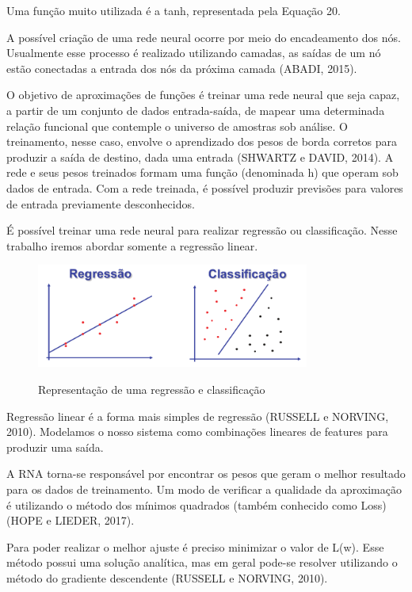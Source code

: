 Uma função muito utilizada é a tanh, representada pela Equação 20.

A possível criação de uma rede neural ocorre por meio do encadeamento dos nós. Usualmente esse processo é realizado utilizando camadas, as saídas de um nó estão conectadas a entrada dos nós da próxima camada (ABADI, 2015).

O objetivo de aproximações de funções é treinar uma rede neural que seja capaz, a partir de um conjunto de dados entrada-saída, de mapear uma determinada relação funcional que contemple o universo de amostras sob análise. O treinamento, nesse caso, envolve o aprendizado dos pesos de borda corretos para produzir a saída de destino, dada uma entrada (SHWARTZ e DAVID, 2014). A rede e seus pesos treinados formam uma função (denominada h) que operam sob dados de entrada. Com a rede treinada, é possível produzir previsões para valores de entrada previamente desconhecidos.

É possível treinar uma rede neural para realizar regressão ou classificação. Nesse trabalho iremos abordar somente a regressão linear. 

\begin{figure}
    \caption{Representação de uma regressão e classificação}
    \centering
    \includegraphics[width=0.8\textwidth]{Textuais/Figuras/ai.pdf}
    \label{fig:reg-class}
\end{figure}

Regressão linear é a forma mais simples de regressão (RUSSELL e NORVING, 2010). Modelamos o nosso sistema como combinações lineares de features para produzir uma saída.

A RNA torna-se responsável por encontrar os pesos que geram o melhor resultado para os dados de treinamento. Um modo de verificar a qualidade da aproximação é utilizando o método dos mínimos quadrados (também conhecido como Loss) (HOPE e LIEDER, 2017).

Para poder realizar o melhor ajuste é preciso minimizar o valor de L(w). Esse método possui uma solução analítica, mas em geral pode-se resolver utilizando o método do gradiente descendente (RUSSELL e NORVING, 2010).

